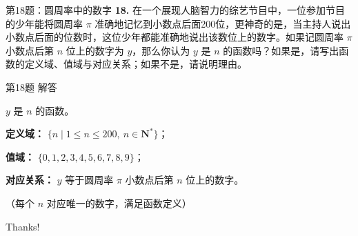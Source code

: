 \documentclass[10pt,aspectratio=169,serif]{beamer}
\begin{document}
\begin{frame}[t]{第18题：圆周率中的数字}
\textbf{18.} 在一个展现人脑智力的综艺节目中，一位参加节目的少年能将圆周率 $\pi$ 准确地记忆到小数点后面200位，更神奇的是，当主持人说出小数点后面的位数时，这位少年都能准确地说出该数位上的数字。如果记圆周率 $\pi$ 小数点后第 $n$ 位上的数字为 $y$，那么你认为 $y$ 是 $n$ 的函数吗？如果是，请写出函数的定义域、值域与对应关系；如果不是，请说明理由。
\end{frame}

\begin{frame}[t]{第18题 解答}
\begin{tcolorbox}[colback=orange!10,colframe=orange,title=\textbf{解}]
$y$ 是 $n$ 的函数。

\vspace{0.5em}
\textbf{定义域：} $\{n \mid 1 \le n \le 200,\ n \in \mathbf{N}^*\}$；

\textbf{值域：} $\{0, 1, 2, 3, 4, 5, 6, 7, 8, 9\}$；

\textbf{对应关系：} $y$ 等于圆周率 $\pi$ 小数点后第 $n$ 位上的数字。

\vspace{0.5em}
（每个 $n$ 对应唯一的数字，满足函数定义）
\end{tcolorbox}
\end{frame}

\begin{frame}[c]
  \begin{center}
    {\Huge\calligra Thanks!}
  \end{center}
\end{frame}
\end{document}
